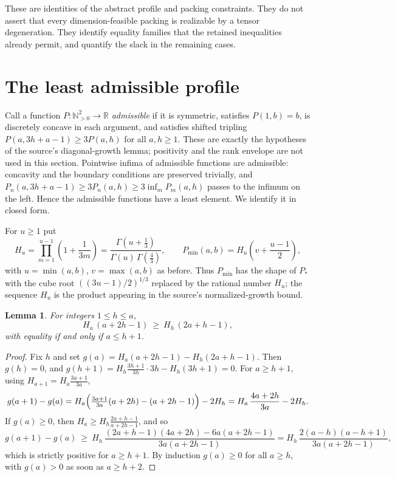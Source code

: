 \documentclass[11pt]{article}
\newtheorem{lemma}{Lemma}
\begin{document}
These are identities of the abstract profile and packing constraints.
They do not assert that every dimension-feasible packing is realizable
by a tensor degeneration. They identify equality families that the
retained inequalities already permit, and quantify the slack in the
remaining cases.

\section{The least admissible profile}\label{sec:least}
Call a function $P:\mathbb N_{>0}^2\to\mathbb R$ \emph{admissible} if it is symmetric,
satisfies $P(1,b)=b$, is discretely concave in each argument, and
satisfies shifted tripling $P(a,3h+a-1)\ge3P(a,h)$ for all $a,h\ge1$.
These are exactly the hypotheses of the source's diagonal-growth lemma;
positivity and the rank envelope are not used in this section.
Pointwise infima of admissible functions are admissible: concavity and
the boundary conditions are preserved trivially, and
$P_n(a,3h+a-1)\ge3P_n(a,h)\ge3\inf_mP_m(a,h)$ passes to the infimum
on the left. Hence the admissible functions have a least element.
We identify it in closed form.

For $u\ge1$ put
\[
 H_u=\prod_{m=1}^{u-1}\left(1+\frac1{3m}\right)
    =\frac{\Gamma(u+\tfrac13)}{\Gamma(u)\,\Gamma(\tfrac43)},
 \qquad
 P_{\min}(a,b)=H_u\left(v+\frac{u-1}{2}\right),
\]
with $u=\min(a,b)$, $v=\max(a,b)$ as before. Thus $P_{\min}$ has the
shape of $P_*$ with the cube root $((3u-1)/2)^{1/3}$ replaced by the
rational number $H_u$; the sequence $H_u$ is the product appearing in
the source's normalized-growth bound.

\begin{lemma}\label{lem:ratio}
For integers $1\le h\le a$,
\[
 H_a\,(a+2h-1)\ \ge\ H_h\,(2a+h-1),
\]
with equality if and only if $a\le h+1$.
\end{lemma}
\begin{proof}
Fix $h$ and set $g(a)=H_a(a+2h-1)-H_h(2a+h-1)$. Then $g(h)=0$, and
$g(h+1)=H_h\frac{3h+1}{3h}\cdot3h-H_h(3h+1)=0$. For $a\ge h+1$, using
$H_{a+1}=H_a\frac{3a+1}{3a}$,
\[
 g(a+1)-g(a)=H_a\Bigl(\tfrac{3a+1}{3a}(a+2h)-(a+2h-1)\Bigr)-2H_h
            =H_a\,\frac{4a+2h}{3a}-2H_h.
\]
If $g(a)\ge0$, then $H_a\ge H_h\frac{2a+h-1}{a+2h-1}$, and so
\[
 g(a+1)-g(a)\ \ge\ H_h\,
 \frac{(2a+h-1)(4a+2h)-6a(a+2h-1)}{3a(a+2h-1)}
 =H_h\,\frac{2(a-h)(a-h+1)}{3a(a+2h-1)},
\]
which is strictly positive for $a\ge h+1$. By induction $g(a)\ge0$ for
all $a\ge h$, with $g(a)>0$ as soon as $a\ge h+2$.
\end{proof}
\end{document}
